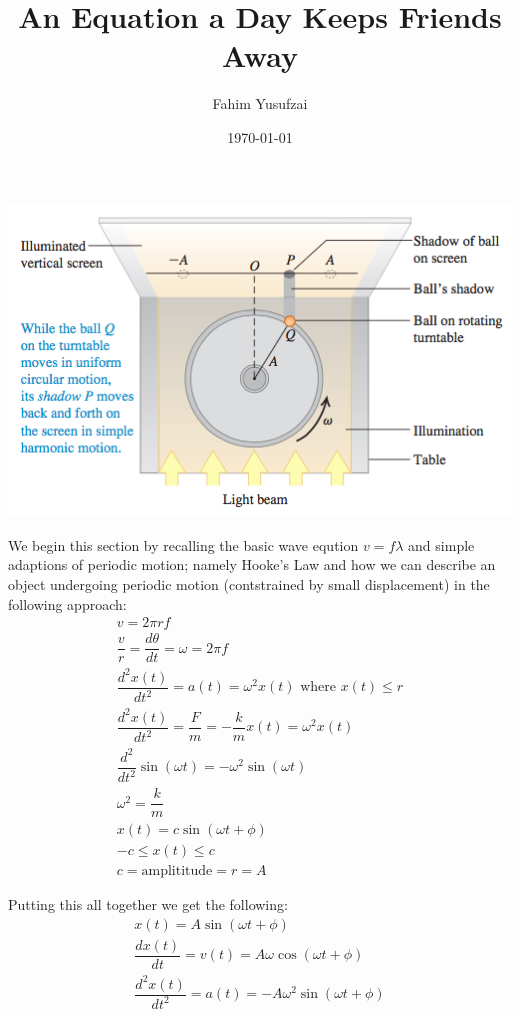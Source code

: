 \documentclass[11pt]{article}
\begin{document}
\author{Fahim Yusufzai}
\title{An Equation a Day Keeps Friends Away}
\date{\today}
\maketitle
\pagebreak

\begin{center}
\includegraphics[scale=0.5]{demo}
\end{center}
We begin this section by recalling the basic wave eqution 
$v = f \lambda$ and simple adaptions of periodic motion;
namely Hooke's Law and how we can describe an object undergoing periodic 
motion (contstrained by small displacement) in the following approach:
	\begin{eqnarray}
	v = 2 \pi r f \\
	\dfrac{v}{r} = \dfrac{d \theta}{dt} = \omega = 2 \pi f \\ 
	\dfrac{d^2x(t)}{dt^2} = a(t) = \omega^2x(t) 
	\textrm{ where } x(t) \leq r\\
	\dfrac{d^2x(t)}{dt^2} = \dfrac{F}{m} = -\dfrac{k}{m} x(t)
	 =  \omega^2x(t) \\
	\dfrac{d^2}{dt^2} \sin(\omega t) = - \omega^2 \sin(\omega t) \\
	\omega^2 = \dfrac{k}{m} \\
	x(t) = c \sin (\omega t + \phi) \\
	-c \leq x(t) \leq c \\
	c = \textrm{amplititude} = r = A
	\end{eqnarray}

Putting this all together we get the following: 
	\begin{eqnarray}
	x(t) = A \sin (\omega t + \phi) \\
	\dfrac{dx(t)}{dt} = v(t) = A\omega \cos (\omega t + \phi) \\
	\dfrac{d^2x(t)}{dt^2} = a(t) = -A\omega^2 \sin (\omega t + \phi) \\
	\end{eqnarray}
\end{document}
